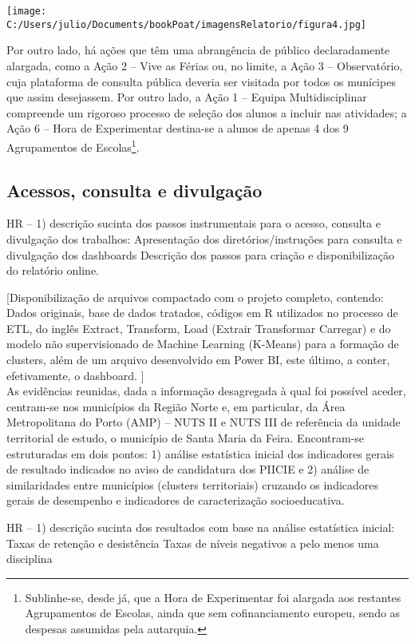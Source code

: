 \documentclass[
]{book}
\begin{document}
\texttt{[image: C:/Users/julio/Documents/bookPoat/imagensRelatorio/figura4.jpg]}

Por outro lado, há ações que têm uma abrangência de público declaradamente alargada, como a Ação 2 -- Vive as Férias ou, no limite, a Ação 3 -- Observatório, cuja plataforma de consulta pública deveria ser visitada por todos os munícipes que assim desejassem. Por outro lado, a Ação 1 -- Equipa Multidisciplinar compreende um rigoroso processo de seleção dos alunos a incluir nas atividades; a Ação 6 -- Hora de Experimentar destina-se a alunos de apenas 4 dos 9 Agrupamentos de Escolas\footnote{Sublinhe-se, desde já, que a Hora de Experimentar foi alargada aos restantes Agrupamentos de Escolas, ainda que sem cofinanciamento europeu, sendo as despesas assumidas pela autarquia.}.

\hypertarget{acessos-consulta-e-divulgauxe7uxe3o}{%
\subsection{Acessos, consulta e divulgação}\label{acessos-consulta-e-divulgauxe7uxe3o}}

HR -- 1) descrição sucinta dos passos instrumentais para o acesso, consulta e divulgação dos trabalhos:
Apresentação dos diretórios/instruções para consulta e divulgação dos dashboards
Descrição dos passos para criação e disponibilização do relatório online.

{[}Disponibilização de arquivos compactado com o projeto completo, contendo: Dados originais, base de dados tratados, códigos em R utilizados no processo de ETL, do inglês Extract, Transform, Load (Extrair Transformar Carregar) e do modelo não supervisionado de Machine Learning (K-Means) para a formação de clusters, além de um arquivo desenvolvido em Power BI, este último, a conter, efetivamente, o dashboard. {]}\\
As evidências reunidas, dada a informação desagregada à qual foi possível aceder, centram-se nos municípios da Região Norte e, em particular, da Área Metropolitana do Porto (AMP) -- NUTS II e NUTS III de referência da unidade territorial de estudo, o município de Santa Maria da Feira. Encontram-se estruturadas em dois pontos: 1) análise estatística inicial dos indicadores gerais de resultado indicados no aviso de candidatura dos PIICIE e 2) análise de similaridades entre municípios (clusters territoriais) cruzando os indicadores gerais de desempenho e indicadores de caracterização socioeducativa.

HR -- 1) descrição sucinta dos resultados com base na análise estatística inicial:\\
Taxas de retenção e desistência
Taxas de níveis negativos a pelo menos uma disciplina
\end{document}
